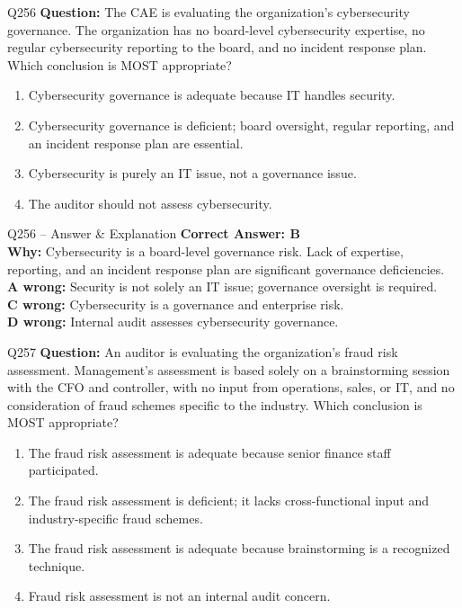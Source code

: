 \documentclass[aspectratio=169,10pt]{beamer}
\begin{document}
	\begin{frame}[t]{Q256}
		\small
		\textbf{Question:} The CAE is evaluating the organization's cybersecurity governance. The organization has no board-level cybersecurity expertise, no regular cybersecurity reporting to the board, and no incident response plan. Which conclusion is MOST appropriate?
		\begin{enumerate}[label=\Alph*.,itemsep=1pt,topsep=2pt]
			\item Cybersecurity governance is adequate because IT handles security.
			\item Cybersecurity governance is deficient; board oversight, regular reporting, and an incident response plan are essential.
			\item Cybersecurity is purely an IT issue, not a governance issue.
			\item The auditor should not assess cybersecurity.
		\end{enumerate}
	\end{frame}
	
	\begin{frame}[t]{Q256 -- Answer \& Explanation}
		\small
		\textbf{Correct Answer: B} \\[4pt]
		\textbf{Why:} Cybersecurity is a board-level governance risk. Lack of expertise, reporting, and an incident response plan are significant governance deficiencies. \\[4pt]
		\textbf{A wrong:} Security is not solely an IT issue; governance oversight is required. \\[2pt]
		\textbf{C wrong:} Cybersecurity is a governance and enterprise risk. \\[2pt]
		\textbf{D wrong:} Internal audit assesses cybersecurity governance.
	\end{frame}
	
	\begin{frame}[t]{Q257}
		\small
		\textbf{Question:} An auditor is evaluating the organization's fraud risk assessment. Management's assessment is based solely on a brainstorming session with the CFO and controller, with no input from operations, sales, or IT, and no consideration of fraud schemes specific to the industry. Which conclusion is MOST appropriate?
		\begin{enumerate}[label=\Alph*.,itemsep=1pt,topsep=2pt]
			\item The fraud risk assessment is adequate because senior finance staff participated.
			\item The fraud risk assessment is deficient; it lacks cross-functional input and industry-specific fraud schemes.
			\item The fraud risk assessment is adequate because brainstorming is a recognized technique.
			\item Fraud risk assessment is not an internal audit concern.
		\end{enumerate}
	\end{frame}
	
\end{document}
